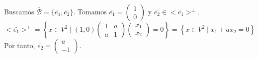 \begin{ejercicio}
\begin{itemize}
\begin{itemize}
            Buscamos $\bar{\mathcal{B}} = \{\bar{e_1}, \bar{e_2}\}$. Tomamos $\bar{e_1} = \left( \begin{array}{c}
                1 \\ 0
            \end{array}\right)$ y $\bar{e_2} \in <\bar{e_1}>^\perp$.
            \begin{equation*}
                <\bar{e_1}>^\perp = \left\{ x\in V^2 \mid (1,0) \left( \begin{array}{cc}
                    1 & a \\
                    a & 1
                \end{array} \right) \left( \begin{array}{c}
                    x_1 \\ x_2
                \end{array}\right) = 0\right\} = \left\{ x \in V^2 \mid x_1 + ax_2 = 0\right\}
            \end{equation*}
            Por tanto, $\bar{e_2}=\left( \begin{array}{c}
                a \\ -1
            \end{array}\right)$.


\end{itemize}
\end{itemize}
\end{ejercicio}
